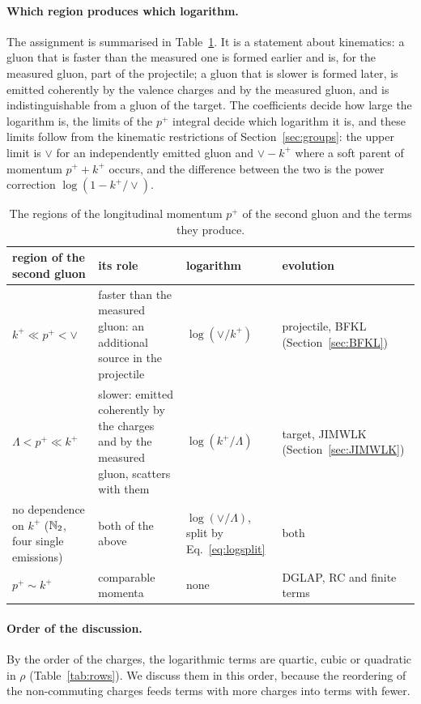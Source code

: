 \paragraph{Which region produces which logarithm.} The assignment is summarised in Table~\ref{tab:logregions}. It is a statement about kinematics: a gluon that is faster than the measured one is formed earlier and is, for the measured gluon, part of the projectile; a gluon that is slower is formed later, is emitted coherently by the valence charges and by the measured gluon, and is indistinguishable from a gluon of the target. The coefficients decide how large the logarithm is, the limits of the $p^+$ integral decide which logarithm it is, and these limits follow from the kinematic restrictions of Section~\ref{sec:groups}: the upper limit is $\vee$ for an independently emitted gluon and $\vee-k^+$ where a soft parent of momentum $p^++k^+$ occurs, and the difference between the two is the power correction $\log(1-k^+/\vee)$.
\begin{table}[t]
\centering
\renewcommand{\arraystretch}{1.25}
\footnotesize
\begin{tabular}{@{}>{\raggedright\arraybackslash}p{}>{\raggedright\arraybackslash}p{}>{\raggedright\arraybackslash}p{}>{\raggedright\arraybackslash}p{}@{}}
\toprule
region of the second gluon & its role & logarithm & evolution\\
\midrule
$k^+\ll p^+<\vee$ & faster than the measured gluon: an additional source in the projectile & $\log(\vee/k^+)$ & projectile, BFKL (Section~\ref{sec:BFKL})\\
$\Lambda<p^+\ll k^+$ & slower: emitted coherently by the charges and by the measured gluon, scatters with them & $\log(k^+/\Lambda)$ & target, JIMWLK (Section~\ref{sec:JIMWLK})\\
no dependence on $k^+$ ($\mathbb{N}_2$, four single emissions) & both of the above & $\log(\vee/\Lambda)$, split by Eq.~\eqref{eq:logsplit} & both\\
$p^+\sim k^+$ & comparable momenta & none & DGLAP, RC and finite terms\\
\bottomrule
\end{tabular}
\caption{The regions of the longitudinal momentum $p^+$ of the second gluon and the terms they produce.}
\label{tab:logregions}
\end{table}

\paragraph{Order of the discussion.} By the order of the charges, the logarithmic terms are quartic, cubic or quadratic in $\rho$ (Table~\ref{tab:rows}). We discuss them in this order, because the reordering of the non-commuting charges feeds terms with more charges into terms with fewer.


